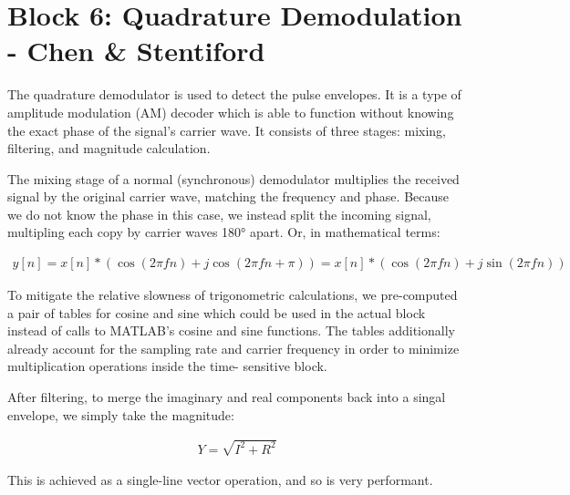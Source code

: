 
\section{Block 6: Quadrature Demodulation - Chen & Stentiford}

The quadrature demodulator is used to detect the pulse envelopes. It is a type of 
amplitude modulation (AM) decoder which is able to function without knowing the exact 
phase of the signal's carrier wave. It consists of three stages: mixing, filtering, 
and magnitude calculation.

The mixing stage of a normal (synchronous) demodulator multiplies the received signal 
by the original carrier wave, matching the frequency and phase. Because we do not know 
the phase in this case, we instead split the incoming signal, multipling each copy by 
carrier waves 180° apart. Or, in mathematical terms:

\begin{align*}
    y[n] = x[n]*(\cos(2 \pi f n)+j \cos(2 \pi f n+\pi)) = x[n]*(\cos(2 \pi f n)+j \sin(2 \pi f n))
\end{align*}

To mitigate the relative slowness of trigonometric calculations, we pre-computed a pair of 
tables for cosine and sine which could be used in the actual block instead of calls to 
MATLAB's cosine and sine functions. The tables additionally already account for the sampling 
rate and carrier frequency in order to minimize multiplication operations inside the time-
sensitive block.

After filtering, to merge the imaginary and real components back into a singal envelope, we 
simply take the magnitude:

\begin{align*}
    Y = \sqrt{I^2 + R^2}
\end{align*}

This is achieved as a single-line vector operation, and so is very performant.